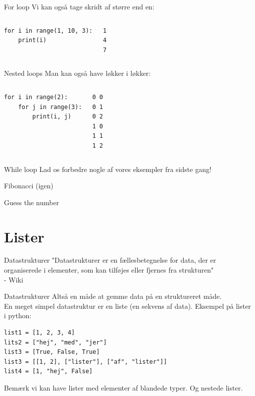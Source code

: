 \begin{frame}[fragile]{For loop}
	Vi kan også tage skridt af større end en:
	\begin{columns}
		\begin{lstlisting}[style=python]
for i in range(1, 10, 3):
	print(i)
		\end{lstlisting}
				\begin{lstlisting}[style=python]
1
4
7
		\end{lstlisting}
	\end{columns}
\end{frame}



\begin{frame}[fragile]{Nested loops}
	Man kan også have løkker i løkker:
	\begin{columns}
		\column{0.4\textwidth}
		\begin{lstlisting}[style=python]
for i in range(2):
	for j in range(3):
		print(i, j)
		\end{lstlisting}
		\pause
		\column{0.4\textwidth}
		\begin{lstlisting}[style=python]
0 0
0 1
0 2
1 0
1 1
1 2
		\end{lstlisting}
	\end{columns}
\end{frame}

\begin{frame}[fragile]{While loop}
Lad os forbedre nogle af vores eksempler fra sidste gang!

Fibonacci (igen)

Guess the number
\end{frame}


\section{Lister}

\begin{frame}{Datastrukturer}
	\Large
	"Datastrukturer er en fællesbetegnelse for data, der er organiserede i elementer, som kan tilføjes eller fjernes fra strukturen"\\
	 - Wiki
\end{frame}


\begin{frame}[fragile]{Datastrukturer}
	Altså en måde at gemme data på en struktureret måde.\\
	En meget simpel datastruktur er en liste (en sekvens af data).
	\vfill
	Eksempel på lister i python:
	\begin{lstlisting}[style=python]
list1 = [1, 2, 3, 4]
lits2 = ["hej", "med", "jer"]
list3 = [True, False, True]
list3 = [[1, 2], ["lister"], ["af", "lister"]]
list4 = [1, "hej", False]
	\end{lstlisting}
	Bemærk vi kan have lister med elementer af blandede typer. Og nestede lister.
\end{frame}

